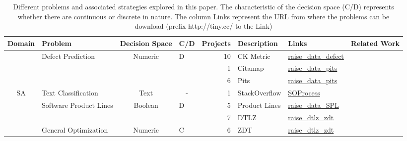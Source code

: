 \documentclass[table, xcdraw, sigconf,review, anonymous]{acmart}
\begin{document}
\cite{mathew2017shorter}

\begin{table}[]
\centering
\caption{Different problems and associated strategies explored in this paper. The characteristic of the decision space (C/D) represents whether there are continuous or discrete in nature. The column Links represent the URL from where the problems can be download (prefix http://tiny.cc/ to the Link)}
\label{tbl:only1}
\begin{tabular}{@{}cp{3cm}cp{0.7cm}rp{3cm}lr@{}}
\toprule
\textbf{Domain} & \textbf{Problem} & \textbf{Decision Space} & \textbf{C/D} & \textbf{Projects} & \textbf{Description} & \textbf{Links} & \textbf{Related Work} \\ \midrule
 & Defect Prediction & Numeric & D & 10 & CK Metric & \href{http://tiny.cc/raise_data_defect}{raise\_data\_defect} & \cite{fu2016tuning} \\
 & \cellcolor[HTML]{EFEFEF} & \cellcolor[HTML]{EFEFEF} & \multicolumn{1}{c}{\cellcolor[HTML]{EFEFEF}} & \cellcolor[HTML]{EFEFEF}1 & \cellcolor[HTML]{EFEFEF}Citamap & \cellcolor[HTML]{EFEFEF}\href{http://tiny.cc/raise_data_pits}{raise\_data\_pits} & \cellcolor[HTML]{EFEFEF} \\
 & \cellcolor[HTML]{EFEFEF} & \cellcolor[HTML]{EFEFEF} & \multicolumn{1}{c}{\cellcolor[HTML]{EFEFEF}} & \cellcolor[HTML]{EFEFEF}6 & \cellcolor[HTML]{EFEFEF}Pits & \cellcolor[HTML]{EFEFEF}\href{http://tiny.cc/raise_data_pits}{raise\_data\_pits} & \cellcolor[HTML]{EFEFEF} \\
\multirow{-4}{*}{SA} & \multirow{-3}{*}{\cellcolor[HTML]{EFEFEF}Text Classification} & \multirow{-3}{*}{\cellcolor[HTML]{EFEFEF}Text} & \multicolumn{1}{c}{\multirow{-3}{*}{\cellcolor[HTML]{EFEFEF}-}} & \cellcolor[HTML]{EFEFEF}1 & \cellcolor[HTML]{EFEFEF}StackOverflow & \cellcolor[HTML]{EFEFEF}\href{http://tiny.cc/SOProcess}{SOProcess} & \multirow{-3}{*}{\cellcolor[HTML]{EFEFEF}\cite{agrawalwrong}} \\ \midrule
 & Software Product Lines & Boolean & D & 5 & Product Lines & \href{http://tiny.cc/raise_data_SPL}{raise\_data\_SPL} & \cite{chen2017sampling} \\
 & \cellcolor[HTML]{EFEFEF} & \cellcolor[HTML]{EFEFEF} & \cellcolor[HTML]{EFEFEF} & \cellcolor[HTML]{EFEFEF}7 & \cellcolor[HTML]{EFEFEF}DTLZ & \cellcolor[HTML]{EFEFEF}\href{http://tiny.cc/raise_dtlz_zdt}{raise\_dtlz\_zdt} & \cellcolor[HTML]{EFEFEF} \\
 & \multirow{-2}{*}{\cellcolor[HTML]{EFEFEF}General Optimization} & \multirow{-2}{*}{\cellcolor[HTML]{EFEFEF}Numeric} & \multirow{-2}{*}{\cellcolor[HTML]{EFEFEF}C} & \cellcolor[HTML]{EFEFEF}6 & \cellcolor[HTML]{EFEFEF}ZDT & \cellcolor[HTML]{EFEFEF}\href{http://tiny.cc/raise_dtlz_zdt}{raise\_dtlz\_zdt} & \multirow{-2}{*}{\cellcolor[HTML]{EFEFEF}\cite{nair2016accidental}} \\

\end{tabular}
\end{table}
\end{document}
